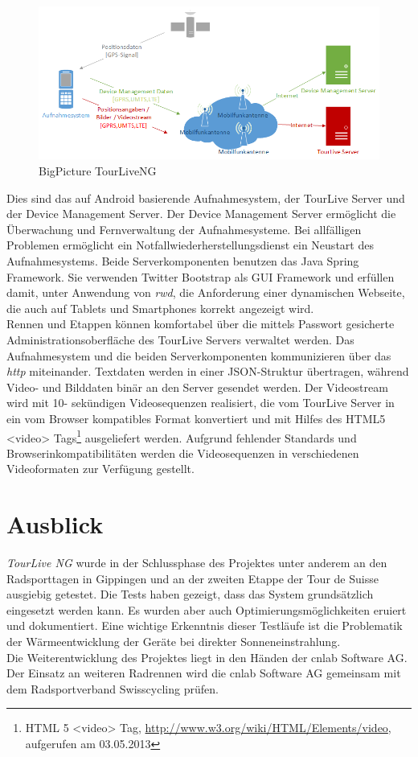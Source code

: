 \begin{figure}[H]
	\centering
	\includegraphics[width=140mm]{images/android/BigPicture_AndroidClient.png} 
	\caption{BigPicture TourLiveNG}
	\label{fig:bigpictureandroid}
\end{figure}
Dies sind das auf Android basierende Aufnahmesystem, der TourLive Server und der Device Management Server. Der Device Management Server ermöglicht die Überwachung und Fernverwaltung der Aufnahmesysteme. Bei allfälligen Problemen ermöglicht ein Notfallwiederherstellungsdienst ein Neustart des Aufnahmesystems. Beide Serverkomponenten benutzen das  Java Spring Framework. Sie verwenden Twitter Bootstrap als GUI Framework und erfüllen damit, unter Anwendung von \textit{\gls{rwd}}, die Anforderung einer dynamischen Webseite, die auch auf Tablets und Smartphones korrekt angezeigt wird. 
\\

Rennen und Etappen können komfortabel über die mittels Passwort gesicherte Administrationsoberfläche des TourLive Servers verwaltet werden. Das Aufnahmesystem und die beiden Serverkomponenten kommunizieren über das \textit{\gls{http}} miteinander. Textdaten werden in einer JSON-Struktur übertragen, während Video- und Bilddaten binär an den Server gesendet  werden. Der Videostream wird mit 10- sekündigen Videosequenzen realisiert, die vom TourLive Server in ein vom Browser kompatibles Format konvertiert und mit Hilfes des HTML5 <video> Tags\footnote{HTML 5 <video> Tag,  \url{http://www.w3.org/wiki/HTML/Elements/video}, aufgerufen am 03.05.2013} ausgeliefert werden. Aufgrund fehlender Standards und Browserinkompatibilitäten werden die Videosequenzen in verschiedenen Videoformaten zur Verfügung gestellt.


\section*{Ausblick}
\textit{TourLive NG} wurde in der Schlussphase des Projektes unter anderem an den Radsporttagen in Gippingen und an der zweiten Etappe der Tour de Suisse ausgiebig getestet. Die Tests haben gezeigt, dass das System grundsätzlich eingesetzt werden kann. Es wurden aber auch  Optimierungsmöglichkeiten eruiert und dokumentiert. Eine wichtige Erkenntnis dieser Testläufe ist die Problematik der Wärmeentwicklung der Geräte bei direkter Sonneneinstrahlung.
\\ %

Die Weiterentwicklung des Projektes liegt in den Händen der cnlab Software AG. Der Einsatz an weiteren Radrennen wird die cnlab Software AG gemeinsam mit dem Radsportverband Swisscycling prüfen.

